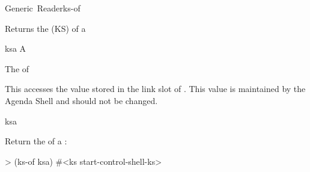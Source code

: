 \documentclass[10pt,twoside,english,pdftex]{article}
\begin{document}
\begin{functiondoc}{Generic~Reader}{ks-of}{ 
    \returns{} }
%
%
%

\fnsyntax

\fnpurpose Returns the  (KS) 
of a 

\fnmethods
{}

\fnpackage {}

\fnmodule {}

\fnargs
\begin{args}{ksa}
\arg[ksa] A 
\end{args}

\fnreturns The   of 
  
\fndescription 
This  accesses the value stored in the
 link slot of .  This value is
maintained by the Agenda Shell and should not be changed.

\begin{alsos}{ksa}
\also[ks]
\also[ksa]
\end{alsos}

\fnexample
Return the  of a :
\begin{example}
> (ks-of ksa)
#<ks start-control-shell-ks>
\end{example}

\end{functiondoc}

\end{document}
